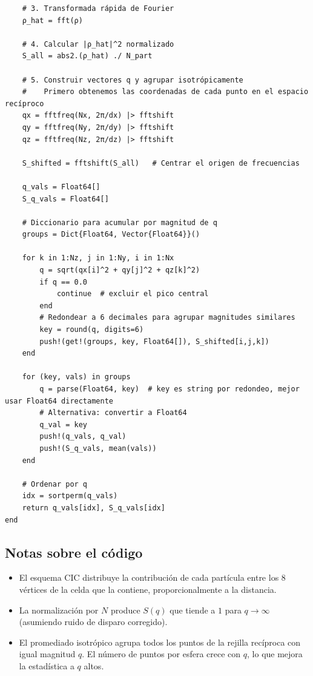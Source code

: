 \documentclass[justified, notoc]{tufte-handout}
\begin{document}
\begin{verbatim}
    # 3. Transformada rápida de Fourier
    ρ_hat = fft(ρ)
    
    # 4. Calcular |ρ_hat|^2 normalizado
    S_all = abs2.(ρ_hat) ./ N_part
    
    # 5. Construir vectores q y agrupar isotrópicamente
    #    Primero obtenemos las coordenadas de cada punto en el espacio recíproco
    qx = fftfreq(Nx, 2π/dx) |> fftshift
    qy = fftfreq(Ny, 2π/dy) |> fftshift
    qz = fftfreq(Nz, 2π/dz) |> fftshift
    
    S_shifted = fftshift(S_all)   # Centrar el origen de frecuencias
    
    q_vals = Float64[]
    S_q_vals = Float64[]
    
    # Diccionario para acumular por magnitud de q
    groups = Dict{Float64, Vector{Float64}}()
    
    for k in 1:Nz, j in 1:Ny, i in 1:Nx
        q = sqrt(qx[i]^2 + qy[j]^2 + qz[k]^2)
        if q == 0.0
            continue  # excluir el pico central
        end
        # Redondear a 6 decimales para agrupar magnitudes similares
        key = round(q, digits=6)
        push!(get!(groups, key, Float64[]), S_shifted[i,j,k])
    end
    
    for (key, vals) in groups
        q = parse(Float64, key)  # key es string por redondeo, mejor usar Float64 directamente
        # Alternativa: convertir a Float64
        q_val = key
        push!(q_vals, q_val)
        push!(S_q_vals, mean(vals))
    end
    
    # Ordenar por q
    idx = sortperm(q_vals)
    return q_vals[idx], S_q_vals[idx]
end
\end{verbatim}

\subsection*{Notas sobre el código}
\begin{itemize}
    \item El esquema CIC distribuye la contribución de cada partícula entre los 8 vértices de la celda que la contiene, proporcionalmente a la distancia.
    \item La normalización por $N$ produce $S(q)$ que tiende a $1$ para $q \to \infty$ (asumiendo ruido de disparo corregido).
    \item El promediado isotrópico agrupa todos los puntos de la rejilla recíproca con igual magnitud $q$. El número de puntos por esfera crece con $q$, lo que mejora la estadística a $q$ altos.
\end{itemize}
\end{document}
